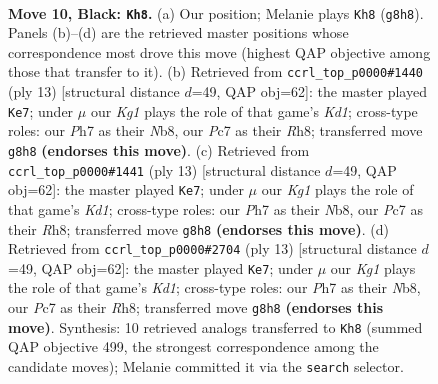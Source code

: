 \documentclass[11pt]{article}
\begin{document}
\clearpage

\begin{figure}[p]\centering
\begin{subfigure}{0.46\textwidth}\centering
\resizebox{\linewidth}{!}{%
\newchessgame
\chessboard[
  setfen={rn1r2k1/ppp2pbp/4bnp1/4p3/1PP1P2P/2N2N2/P3BPP1/R1B1K2R b KQ - 0 10},
  showmover=false,
  pgfstyle=straightmove, color=movearrow, markmove={g8-h8}
]}
\caption{}
\end{subfigure}\hfill
\begin{subfigure}{0.46\textwidth}\centering
\resizebox{\linewidth}{!}{%
\newchessgame
\chessboard[
  setfen={rnbk3r/ppp2ppp/3b1n2/4p3/2B1P3/2N2N2/PPP2PPP/R1B1K2R b KQ - 3 7},
  showmover=false,
  pgfstyle=straightmove, color=movearrow, markmove={d8-e7}
]}
\caption{}
\end{subfigure}
\\[4pt]
\begin{subfigure}{0.46\textwidth}\centering
\resizebox{\linewidth}{!}{%
\newchessgame
\chessboard[
  setfen={rnbk3r/ppp2ppp/3b1n2/4p3/2B1P3/2N2N2/PPP2PPP/R1B1K2R b KQ - 3 7},
  showmover=false,
  pgfstyle=straightmove, color=movearrow, markmove={d8-e7}
]}
\caption{}
\end{subfigure}\hfill
\begin{subfigure}{0.46\textwidth}\centering
\resizebox{\linewidth}{!}{%
\newchessgame
\chessboard[
  setfen={rnbk3r/ppp2ppp/3b1n2/4p3/2B1P3/2N2N2/PPP2PPP/R1B1K2R b KQ - 3 7},
  showmover=false,
  pgfstyle=straightmove, color=movearrow, markmove={d8-e7}
]}
\caption{}
\end{subfigure}
\caption{\textbf{Move 10, Black: \texttt{Kh8}.} (a) Our position; Melanie plays \texttt{Kh8} (\texttt{g8h8}). Panels (b)--(d) are the retrieved master positions whose correspondence most drove this move (highest QAP objective among those that transfer to it). (b) Retrieved from \texttt{ccrl\_top\_p0000\#1440} (ply 13) [structural distance $d$=49, QAP obj=62]: the master played \texttt{Ke7}; under $\mu$ our \emph{Kg1} plays the role of that game's \emph{Kd1}; cross-type roles: our \emph{P}h7 as their \emph{N}b8, our \emph{P}c7 as their \emph{R}h8; transferred move \texttt{g8h8} \textbf{(endorses this move)}. (c) Retrieved from \texttt{ccrl\_top\_p0000\#1441} (ply 13) [structural distance $d$=49, QAP obj=62]: the master played \texttt{Ke7}; under $\mu$ our \emph{Kg1} plays the role of that game's \emph{Kd1}; cross-type roles: our \emph{P}h7 as their \emph{N}b8, our \emph{P}c7 as their \emph{R}h8; transferred move \texttt{g8h8} \textbf{(endorses this move)}. (d) Retrieved from \texttt{ccrl\_top\_p0000\#2704} (ply 13) [structural distance $d$=49, QAP obj=62]: the master played \texttt{Ke7}; under $\mu$ our \emph{Kg1} plays the role of that game's \emph{Kd1}; cross-type roles: our \emph{P}h7 as their \emph{N}b8, our \emph{P}c7 as their \emph{R}h8; transferred move \texttt{g8h8} \textbf{(endorses this move)}. Synthesis: 10 retrieved analogs transferred to \texttt{Kh8} (summed QAP objective 499, the strongest correspondence among the candidate moves); Melanie committed it via the \texttt{search} selector.}
\label{fig:thought-m19}
\end{figure}
\end{document}
